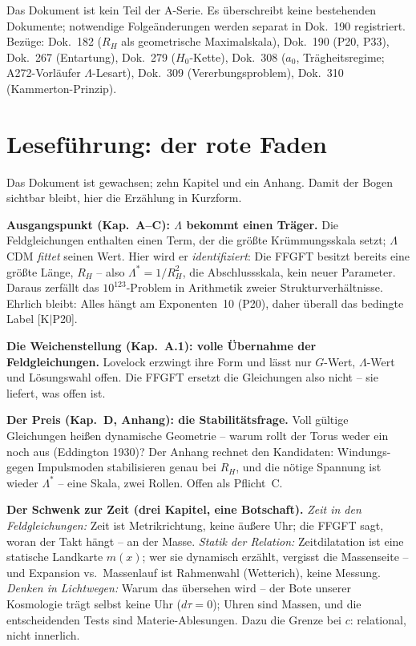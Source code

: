 \documentclass[11pt]{report}
\begin{document}
Das Dokument ist kein Teil der A-Serie. Es überschreibt keine
bestehenden Dokumente; notwendige Folgeänderungen werden separat
in Dok.~190 registriert.
Bezüge: Dok.~182 ($R_H$ als geometrische Maximalskala),
Dok.~190 (P20, P33), Dok.~267 (Entartung), Dok.~279 ($H_0$-Kette),
Dok.~308 ($a_0$, Trägheitsregime; A272-Vorläufer $\Lambda$-Lesart),
Dok.~309 (Vererbungsproblem), Dok.~310 (Kammerton-Prinzip).

\section*{Leseführung: der rote Faden}

Das Dokument ist gewachsen; zehn Kapitel und ein Anhang. Damit der
Bogen sichtbar bleibt, hier die Erzählung in Kurzform.

\textbf{Ausgangspunkt (Kap.~A--C): $\Lambda$ bekommt einen
Träger.} Die Feldgleichungen enthalten einen Term, der die größte
Krümmungsskala setzt; $\Lambda$CDM \emph{fittet} seinen Wert. Hier
wird er \emph{identifiziert}: Die FFGFT besitzt bereits eine größte
Länge, $R_H$ -- also $\Lambda^{*} = 1/R_H^2$, die Abschlussskala,
kein neuer Parameter. Daraus zerfällt das $10^{123}$-Problem in
Arithmetik zweier Strukturverhältnisse. Ehrlich bleibt: Alles hängt
am Exponenten~10 (P20), daher überall das bedingte Label [K$|$P20].

\textbf{Die Weichenstellung (Kap.~A.1): volle Übernahme der
Feldgleichungen.} Lovelock erzwingt ihre Form und lässt nur
$G$-Wert, $\Lambda$-Wert und Lösungswahl offen. Die FFGFT ersetzt
die Gleichungen also nicht -- sie liefert, was offen ist.

\textbf{Der Preis (Kap.~D, Anhang): die Stabilitätsfrage.} Voll
gültige Gleichungen heißen dynamische Geometrie -- warum rollt der
Torus weder ein noch aus (Eddington 1930)? Der Anhang rechnet den
Kandidaten: Windungs- gegen Impulsmoden stabilisieren genau bei
$R_H$, und die nötige Spannung ist wieder $\Lambda^{*}$ -- eine
Skala, zwei Rollen. Offen als Pflicht~C.

\textbf{Der Schwenk zur Zeit (drei Kapitel, eine Botschaft).}
\emph{Zeit in den Feldgleichungen:} Zeit ist Metrikrichtung, keine
äußere Uhr; die FFGFT sagt, woran der Takt hängt -- an der Masse.
\emph{Statik der Relation:} Zeitdilatation ist eine statische
Landkarte $m(x)$; wer sie dynamisch erzählt, vergisst die
Massenseite -- und Expansion vs.\ Massenlauf ist Rahmenwahl
(Wetterich), keine Messung. \emph{Denken in Lichtwegen:} Warum das
übersehen wird -- der Bote unserer Kosmologie trägt selbst keine
Uhr ($d\tau = 0$); Uhren sind Massen, und die entscheidenden Tests
sind Materie-Ablesungen. Dazu die Grenze bei $c$: relational, nicht
innerlich.
\end{document}
